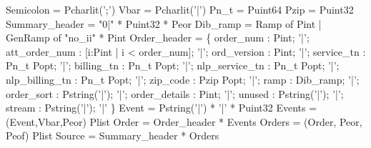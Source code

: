 \begin{code}\scriptsize
{} Semicolon = Pcharlit(';')
 Vbar = Pcharlit('|')
\mbox{}
 Pn\_t = Puint64
 Pzip = Puint32
\mbox{}
 Summary\_header = "0|" * Puint32 * Peor
\mbox{}
 Dib\_ramp = 
  Ramp of Pint 
| GenRamp of "no\_ii" * Pint
\mbox{}
 Order\_header = \{ 
    order\_num : Pint;  
'|'; att\_order\_num : [i:Pint | i < order\_num];  
'|'; ord\_version : Pint;  
'|'; service\_tn : Pn\_t Popt;
'|'; billing\_tn : Pn\_t Popt;  
'|'; nlp\_service\_tn : Pn\_t Popt;  
'|'; nlp\_billing\_tn : Pn\_t Popt;  
'|'; zip\_code : Pzip Popt;  
'|'; ramp : Dib\_ramp;  
'|'; order\_sort : Pstring('|');  
'|'; order\_details : Pint;
'|'; unused : Pstring('|');  
'|'; stream : Pstring('|'); 
'|'
\} 
\mbox{}
 Event  = Pstring('|') * '|' * Puint32
 Events = (Event,Vbar,Peor) Plist
\mbox{}
 Order  = Order\_header * Events
 Orders = (Order, Peor, Peof) Plist
\mbox{}
 Source = Summary\_header * Orders\end{code}
